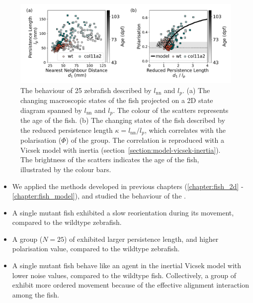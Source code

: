 \documentclass[11pt,twoside]{report}
\begin{document}
 \begin{figure}
  \includegraphics[width=\linewidth]{phase-25}
  \caption[The behaviour of 25 zebrafish described by $l_\mathrm{nn}$ and $l_p$]{
	The behaviour of 25 zebrafish described by $l_\mathrm{nn}$ and $l_p$.
	(a) The changing macroscopic states of the fish projected on a 2D state diagram spanned by $l_\mathrm{nn}$ and $l_p$. The colour of the scatters represents the age of the fish.
	(b) The changing states of the fish described by the reduced persistence length $\kappa = l_\mathrm{nn} / l_p$, which correlates with the polarisation ($\Phi$) of the group. The correlation is reproduced with a Vicsek model with inertia (section~\ref{section:model-vicsek-inertia}).
	The brightness of the scatters indicates the age of the fish, illustrated by the colour bars.
  }
  \label{fig:phase-mutant}
\end{figure}

\vfill

\begin{adjustwidth}{-5cm}{0cm}
\begin{tcolorbox}[
title=Summary of Chapter~7,
fonttitle=\sffamily\Large,
right=0.1\linewidth,
enlarge bottom by=0.5em,
enlarge top by=0.5em,
]
\begin{itemize}
	\item We applied the methods developed in previous chapters (\ref{chapter:fish_2d} - \ref{chapter:fish_model}), and studied the behaviour of the {\mf}.
	\item A single mutant fish exhibited a slow reorientation during its movement, compared to the wildtype zebrafish.
	\item A group ($N=25$) of {\mf} exhibited larger persistence length, and higher polarisation value, compared to the wildtype zebrafish.
	\item A single mutant fish behave like an agent in the inertial Vicsek model with lower noise values, compared to the wildtype fish. Collectively, a group of {\mf} exhibit more ordered movement because of the effective alignment interaction among the fish. 
\end{itemize}
\end{tcolorbox}
\end{adjustwidth}
\end{document}
